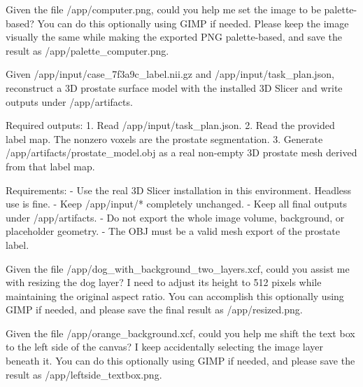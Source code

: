 \documentclass{llmxive}
\begin{document}
\begin{instructionbox}
Given the file \textasciigrave{}/app/computer.png\textasciigrave{}, could you help me set the image to be palette-based? You can do this optionally using GIMP if needed. Please keep the image visually the same while making the exported PNG palette-based, and save the result as \textasciigrave{}/app/palette\_computer.png\textasciigrave{}.
\end{instructionbox}

\begin{instructionbox}
Given \textasciigrave{}/app/input/case\_7f3a9c\_label.nii.gz\textasciigrave{} and \textasciigrave{}/app/input/task\_plan.json\textasciigrave{}, reconstruct a 3D prostate surface model with the installed 3D Slicer and write outputs under \textasciigrave{}/app/artifacts\textasciigrave{}.

Required outputs:
1. Read \textasciigrave{}/app/input/task\_plan.json\textasciigrave{}.
2. Read the provided label map. The nonzero voxels are the prostate segmentation.
3. Generate \textasciigrave{}/app/artifacts/prostate\_model.obj\textasciigrave{} as a real non-empty 3D prostate mesh derived from that label map.

Requirements:
- Use the real 3D Slicer installation in this environment. Headless use is fine.
- Keep \textasciigrave{}/app/input/*\textasciigrave{} completely unchanged.
- Keep all final outputs under \textasciigrave{}/app/artifacts\textasciigrave{}.
- Do not export the whole image volume, background, or placeholder geometry.
- The OBJ must be a valid mesh export of the prostate label.
\end{instructionbox}

\begin{instructionbox}
Given the file \textasciigrave{}/app/dog\_with\_background\_two\_layers.xcf\textasciigrave{}, could you assist me with resizing the dog layer? I need to adjust its height to 512 pixels while maintaining the original aspect ratio. You can accomplish this optionally using GIMP if needed, and please save the final result as \textasciigrave{}/app/resized.png\textasciigrave{}.
\end{instructionbox}

\begin{instructionbox}
Given the file \textasciigrave{}/app/orange\_background.xcf\textasciigrave{}, could you help me shift the text box to the left side of the canvas? I keep accidentally selecting the image layer beneath it. You can do this optionally using GIMP if needed, and please save the result as \textasciigrave{}/app/leftside\_textbox.png\textasciigrave{}.
\end{instructionbox}
\end{document}
